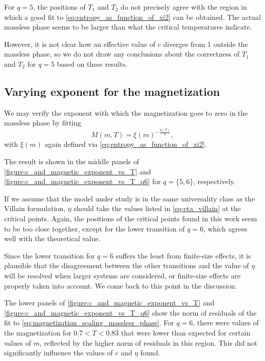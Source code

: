 For $q = 5$, the positions of $T_1$ and $T_2$ do not precisely agree with the region in which a good fit to
\autoref{eq:entropy_as_function_of_xi2} can be obtained.
The actual massless phase seems to be larger than what the critical temperatures indicate.

However, it is not clear how an effective value of $c$ diverges from 1 outside the massless phase,
so we do not draw any conclusions about the correctness of $T_1$ and $T_2$ for $q = 5$ based on these results.

\subsection{Varying exponent for the magnetization}
We may verify the exponent with which the magnetization goes to zero in the massless phase by fitting
\begin{equation}\label{eq:magnetization_scaling_massless_phase}
  M(m, T) = \xi(m)^{-\frac{\eta(T)}{2}},
\end{equation}
with $\xi(m)$ again defined via \autoref{eq:entropy_as_function_of_xi2}.

The result is shown in the middle panels of \autoref{figure:c_and_magnetic_exponent_vs_T} and
\autoref{figure:c_and_magnetic_exponent_vs_T_q6} for $q = \{5, 6\}$,
respectively.

If we assume that the model under study is in the same universality class as the Villain formulation,
$\eta$ should take the values listed in \autoref{eq:eta_villain} at the critical points.
Again, the positions of the critical points found in this work seem to be too close together,
except for the lower transition of $q = 6$, which agrees well with the theoretical value.

Since the lower transition for $q = 6$ suffers the least from finite-size effects,
it is plausible that the disagreement between the other transitions and the value of $\eta$ will be resolved when larger
systems are considered, or finite-size effects are properly taken into account.
We come back to this point in the discussion.

The lower panels of \autoref{figure:c_and_magnetic_exponent_vs_T} and \autoref{figure:c_and_magnetic_exponent_vs_T_q6}
show the norm of residuals of the fit to \autoref{eq:magnetization_scaling_massless_phase}.
For $q = 6$, there were values of the magnetization for $0.7 < T < 0.83$ that were lower than expected
for certain values of $m$, reflected by the higher norm of residuals in this region.
This did not significantly influence the values of $c$ and $\eta$ found.

